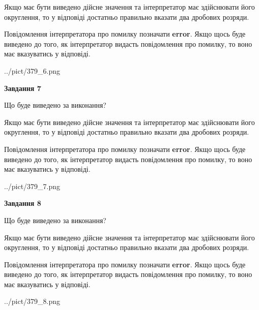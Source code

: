 \documentclass[12pt, ukrainian]{article}
\begin{document}
{\begin {Large}
Якщо має бути виведено дійсне значення та інтерпретатор має здійснювати його округлення, 
то у відповіді достатньо правильно вказати два дробових розряди.

Повідомлення інтерпретатора про помилку позначати \textbf{error}.
Якщо щось буде виведено до того, як інтерпретатор видасть повідомлення про помилку, 
то воно має вказуватись у відповіді. \par

\begin{center}
	{../pict/379_6.png}
\end{center}
\newpage

{\begin {center}\textbf{Завдання 7}\end {center}}\par
Що буде виведено за виконання? \par

Якщо має бути виведено дійсне значення та інтерпретатор має здійснювати його округлення, 
то у відповіді достатньо правильно вказати два дробових розряди.

Повідомлення інтерпретатора про помилку позначати \textbf{error}.
Якщо щось буде виведено до того, як інтерпретатор видасть повідомлення про помилку, 
то воно має вказуватись у відповіді. \par

\begin{center}
	{../pict/379_7.png}
\end{center}
\newpage

{\begin {center}\textbf{Завдання 8}\end {center}}\par
Що буде виведено за виконання? \par

Якщо має бути виведено дійсне значення та інтерпретатор має здійснювати його округлення, 
то у відповіді достатньо правильно вказати два дробових розряди.

Повідомлення інтерпретатора про помилку позначати \textbf{error}.
Якщо щось буде виведено до того, як інтерпретатор видасть повідомлення про помилку, 
то воно має вказуватись у відповіді. \par

\begin{center}
	{../pict/379_8.png}
\end{center}
\newpage


\end{Large}}
\end{document}
